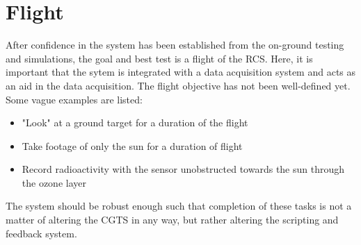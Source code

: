 \section{Flight}
After confidence in the system has been established from the on-ground testing and simulations, the goal and best test is a flight of the RCS. Here, it is important that the sytem is integrated with a data acquisition system and acts as an aid in the data acquisition. The flight objective has not been well-defined yet. Some vague examples are listed:
\begin{itemize}
\item "Look" at a ground target for a duration of the flight
\item Take footage of only the sun for a duration of flight
\item Record radioactivity with the sensor unobstructed towards the sun through the ozone layer
\end{itemize}
The system should be robust enough such that completion of these tasks is not a matter of altering the CGTS in any way, but rather altering the scripting and feedback system. 